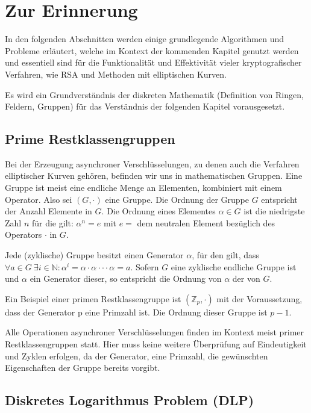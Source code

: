 \chapter{Zur Erinnerung}

In den folgenden Abschnitten werden einige grundlegende Algorithmen und Probleme erläutert, welche im Kontext der kommenden 
Kapitel genutzt werden und essentiell sind für die Funktionalität und Effektivität vieler kryptografischer Verfahren, wie RSA und Methoden mit elliptischen Kurven.

Es wird ein Grundverständnis der diskreten Mathematik (Definition von Ringen, Feldern, Gruppen) für das Verständnis der folgenden Kapitel vorausgesetzt.

\section{Prime Restklassengruppen}

Bei der Erzeugung asynchroner Verschlüsselungen, zu denen auch die Verfahren elliptischer Kurven gehören, befinden wir uns in mathematischen Gruppen.
Eine Gruppe ist meist eine endliche Menge an Elementen, kombiniert mit einem Operator. Also sei $(G,\cdotp)$ eine Gruppe.
Die Ordnung der Gruppe $G$ entspricht der Anzahl Elemente in $G$. Die Ordnung eines Elementes $\alpha \in G$ ist 
die niedrigste Zahl $n$ für die gilt: $\alpha^n = e$ mit $e =$ dem neutralen Element bezüglich des Operators $\cdotp$ in $G$.

Jede (zyklische) Gruppe besitzt einen Generator $\alpha$, für den gilt, dass $\forall a \in G \ \exists i \in  \mathbb{N}: \alpha^i = \alpha \cdotp \alpha \cdotp \cdotp \cdotp \alpha = a $. Sofern $G$ eine zyklische endliche Gruppe ist und $\alpha$ ein Generator dieser, so entspricht die Ordnung von $\alpha$ der von $G$.

Ein Beispiel einer primen Restklassengruppe ist $(\mathbb{Z}_p,\cdotp)$ mit der Voraussetzung, dass der Generator p eine Primzahl ist. Die Ordnung dieser Gruppe ist $p-1$.

Alle Operationen asynchroner Verschlüsselungen finden im Kontext meist primer Restklassengruppen statt. Hier 
muss keine weitere Überprüfung auf Eindeutigkeit und Zyklen erfolgen, da der Generator, eine Primzahl, die gewünschten
Eigenschaften der Gruppe bereits vorgibt.

\section{Diskretes Logarithmus Problem (DLP)}

